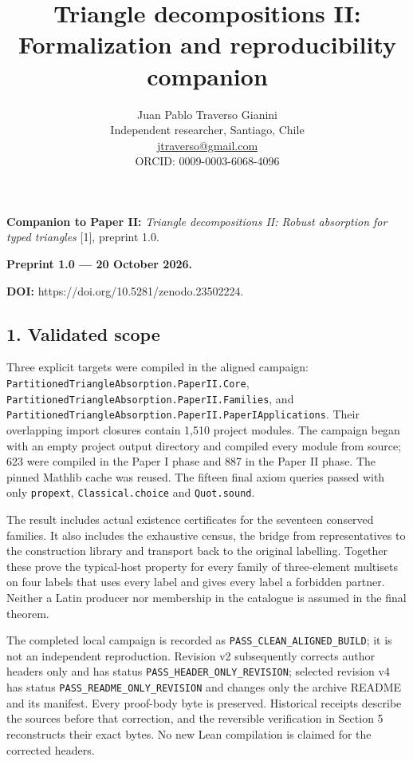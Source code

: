 \documentclass[english,11pt,a4paper]{article}
\title{Triangle decompositions II: Formalization and reproducibility companion}
\author{Juan Pablo Traverso Gianini\\
\small Independent researcher, Santiago, Chile\\
\small \href{mailto:jtraverso@gmail.com}{jtraverso@gmail.com}\\
\small ORCID: 0009-0003-6068-4096}
\date{}
\begin{document}
\raggedbottom
\maketitle
\textbf{Companion to Paper II:} \emph{Triangle decompositions II: Robust absorption for typed triangles} {[}1{]}, preprint 1.0.

\textbf{Preprint 1.0 --- 20 October 2026.}

\textbf{DOI:} https://doi.org/10.5281/zenodo.23502224.

\subsection{1. Validated scope}\label{validated-scope}

Three explicit targets were compiled in the aligned campaign: \texttt{Partitioned\allowbreak{}T\allowbreak{}riangle\allowbreak{}Absor\allowbreak{}ption.\allowbreak{}Paper\allowbreak{}I\allowbreak{}I.\allowbreak{}Core}, \texttt{Partitioned\allowbreak{}T\allowbreak{}riangle\allowbreak{}Absor\allowbreak{}ption.\allowbreak{}Paper\allowbreak{}I\allowbreak{}I.\allowbreak{}Families}, and \texttt{Partitioned\allowbreak{}T\allowbreak{}riangle\allowbreak{}Absor\allowbreak{}ption.\allowbreak{}Paper\allowbreak{}I\allowbreak{}I.\allowbreak{}Paper\allowbreak{}IAppl\allowbreak{}ications}. Their overlapping import closures contain 1,510 project modules. The campaign began with an empty project output directory and compiled every module from source; 623 were compiled in the Paper I phase and 887 in the Paper II phase. The pinned Mathlib cache was reused. The fifteen final axiom queries passed with only \texttt{propext}, \texttt{Classical.\allowbreak{}ch\allowbreak{}oice} and \texttt{Quot.\allowbreak{}sound}.

The result includes actual existence certificates for the seventeen conserved families. It also includes the exhaustive census, the bridge from representatives to the construction library and transport back to the original labelling. Together these prove the typical-host property for every family of three-element multisets on four labels that uses every label and gives every label a forbidden partner. Neither a Latin producer nor membership in the catalogue is assumed in the final theorem.

The completed local campaign is recorded as \texttt{PASS\_\allowbreak{}CLEAN\_\allowbreak{}A\allowbreak{}LIGNED\_\allowbreak{}BUILD\allowbreak{}}; it is not an independent reproduction. Revision v2 subsequently corrects author headers only and has status \texttt{PASS\_\allowbreak{}HEADER\_\allowbreak{}\allowbreak{}ONLY\_\allowbreak{}REVISIO\allowbreak{}N}; selected revision v4 has status \texttt{PASS\_\allowbreak{}README\_\allowbreak{}\allowbreak{}ONLY\_\allowbreak{}REVISIO\allowbreak{}N} and changes only the archive README and its manifest. Every proof-body byte is preserved. Historical receipts describe the sources before that correction, and the reversible verification in Section 5 reconstructs their exact bytes. No new Lean compilation is claimed for the corrected headers.
\end{document}
